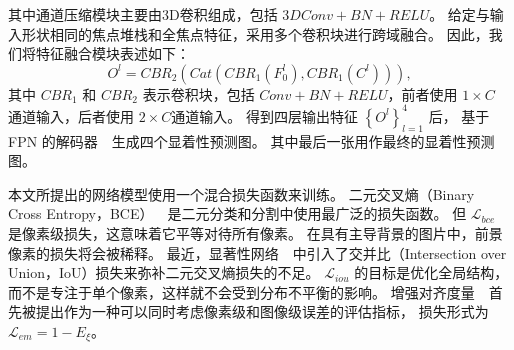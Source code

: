 %
%
其中通道压缩模块主要由3D卷积组成，包括 $3DConv+BN+RELU$。 给定与输入形状相同的焦点堆栈和全焦点特征，采用多个卷积块进行跨域融合。 因此，我们将特征融合模块表述如下：
%
%
%	
\begin{equation}
	O^{l}=CBR_{2}\left (Cat \left (CBR_{1} \left (F_{0}^{l} \right ),CBR_{1} \left (C^{l} \right ) \right ) \right ),
\end{equation}
%
%
其中 $CBR_{1}$ 和 $CBR_{2}$ 表示卷积块，包括 $Conv+BN+RELU$，前者使用 $1 \times C$ 通道输入，后者使用 $2 \times C$通道输入。
得到四层输出特征 $\left \{ O^{l} \right \}_{l=1}^{4} $ 后， 基于 FPN 的解码器~\cite{lin2017feature}~生成四个显着性预测图。 
其中最后一张用作最终的显着性预测图。 
%
%
%
%
%









%
%
本文所提出的网络模型使用一个混合损失函数来训练。
%
%
二元交叉熵（Binary Cross Entropy，BCE）~\cite{de2005tutorial}~是二元分类和分割中使用最广泛的损失函数。 但 $\mathcal L_{bce} $ 是像素级损失，这意味着它平等对待所有像素。
在具有主导背景的图片中，前景像素的损失将会被稀释。 最近，显著性网络~\cite{qin2019basnet}~中引入了交并比（Intersection over Union，IoU）损失来弥补二元交叉熵损失的不足。
$ \mathcal L_{iou} $ 的目标是优化全局结构，而不是专注于单个像素，这样就不会受到分布不平衡的影响。 增强对齐度量~\cite{fan2018enhanced}~首先被提出作为一种可以同时考虑像素级和图像级误差的评估指标，
损失形式为 $ \mathcal L_{em} = 1 - E_{\xi} $。 

